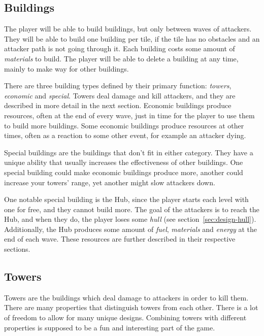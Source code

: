 \subsection{Buildings}\label{sec:design-buildings}

The player will be able to build buildings, but only between waves of attackers.
They will be able to build one building per tile, if the tile has no obstacles and an attacker path is not going through it.
Each building costs some amount of \emph{materials} to build.
The player will be able to delete a building at any time, mainly to make way for other buildings.

There are three building types defined by their primary function: \emph{towers}, \emph{economic} and \emph{special}.
Towers deal damage and kill attackers, and they are described in more detail in the next section.
Economic buildings produce resources, often at the end of every wave, just in time for the player to use them to build more buildings.
Some economic buildings produce resources at other times, often as a reaction to some other event, for example an attacker dying.

Special buildings are the buildings that don't fit in either category.
They have a unique ability that usually increases the effectiveness of other buildings.
One special building could make economic buildings produce more, another could increase your towers' range, yet another might slow attackers down.

One notable special building is the Hub, since the player starts each level with one for free, and they cannot build more.
The goal of the attackers is to reach the Hub, and when they do, the player loses some \emph{hull} (see section~\ref{sec:design-hull}).
Additionally, the Hub produces some amount of \emph{fuel}, \emph{materials} and \emph{energy} at the end of each wave.
These resources are further described in their respective sections.

\subsection{Towers}\label{sec:design-towers}

Towers are the buildings which deal damage to attackers in order to kill them.
There are many properties that distinguish towers from each other.
There is a lot of freedom to allow for many unique designs.
Combining towers with different properties is supposed to be a fun and interesting part of the game.

